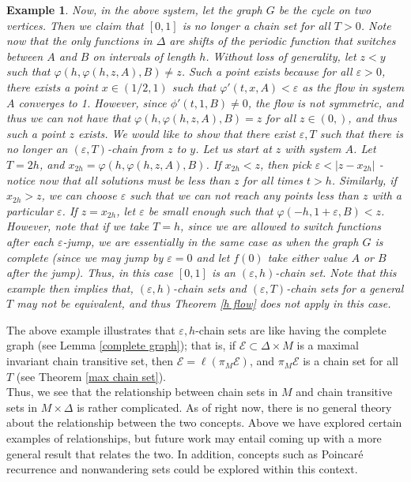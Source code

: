 \documentclass[11pt]{article}
\newtheorem{ex}[thm]{Example}
\begin{document}
\begin{ex}
\indent Now, in the above system, let the graph $G$ be the cycle on two vertices.  Then we claim that $[0,1]$ is no longer a chain set for all $T>0$.  Note now that the only functions in $\Delta$ are shifts of the periodic function that switches between $A$ and $B$ on intervals of length $h$.  Without loss of generality, let $z<y$ such that $\varphi(h,\varphi(h,z,A),B)\not=z$.  Such a point exists because for all $\varepsilon>0$, there exists a point $x\in(1/2,1)$ such that $\varphi'(t,x,A)<\varepsilon$ as the flow in system $A$ converges to 1.  However, since $\phi'(t,1,B)\not=0$, the flow is not symmetric, and thus we can not have that $\varphi(h,\varphi(h,z,A),B)=z$ for all $z\in(0,)$, and thus such a point $z$ exists.  We would like to show that there exist $\varepsilon,T$ such that there is no longer an $(\varepsilon,T)$-chain from $z$ to $y$.  Let us start at $z$ with system $A$.  Let $T=2h$, and $x_{2h}=\varphi(h,\varphi(h,z,A),B)$.  If $x_{2h}<z$, then pick $\varepsilon<|z-x_{2h}|$ - notice now that all solutions must be less than $z$ for all times $t>h$.  Similarly, if $x_{2h}>z$, we can choose $\varepsilon$ such that we can not reach any points less than $z$ with a particular $\varepsilon$. If $z=x_{2h}$, let $\varepsilon$ be small enough such that $\varphi(-h,1+\varepsilon,B)<z$. \\
\indent However, note that if we take $T=h$, since we are allowed to switch functions after each $\varepsilon$-jump, we are essentially in the same case as when the graph $G$ is complete (since we may jump by $\varepsilon=0$ and let $f(0)$ take either value $A$ or $B$ after the jump). Thus, in this case $[0,1]$ is an $(\varepsilon,h)$-chain set.  Note that this example then implies that, $(\varepsilon,h)$-chain sets and $(\varepsilon,T)$-chain sets for a general $T$ may not be equivalent, and thus Theorem \ref{h flow} does not apply in this case.
\end{ex}

The above example illustrates that $\varepsilon,h$-chain sets are like having the complete graph (see Lemma \ref{complete graph}); that is, if $\mathcal{E}\subset \Delta\times M$ is a maximal invariant chain transitive set, then $\mathcal{E}=\ell(\pi_M\mathcal{E})$, and $\pi_M\mathcal{E}$ is a chain set for all $T$ (see Theorem \ref{max chain set}).\\
\indent Thus, we see that the relationship between chain sets in $M$ and chain transitive sets in $M\times \Delta$ is rather complicated. As of right now, there is no general theory about the relationship between the two concepts.  Above we have explored certain examples of relationships, but future work may entail coming up with a more general result that relates the two.  In addition, concepts such as Poincar\'e recurrence and nonwandering sets could be explored within this context.  
\end{document}
